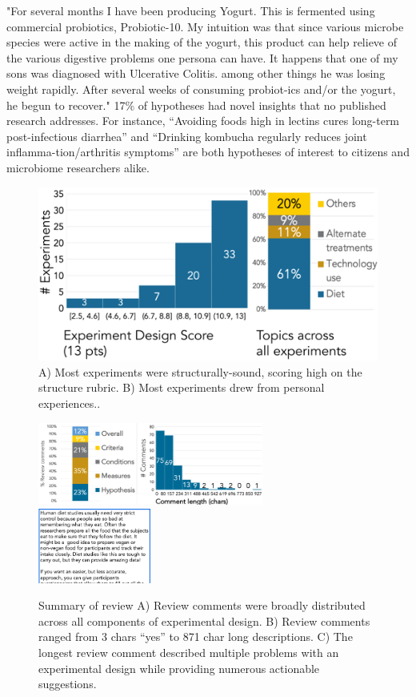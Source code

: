 "For several months I have been producing Yogurt. This is fermented using commercial probiotics, Probiotic-10. My intuition was that since various microbe species were active in the making of the yogurt, this product can help relieve of the various digestive problems one persona can have. It happens that one of my sons was diagnosed with Ulcerative Colitis. among other things he was losing weight rapidly. After several weeks of consuming probiot-ics and/or the yogurt, he begun to recover."
17\% of hypotheses had novel insights that no published research addresses. For instance, “Avoiding foods high in lectins cures long-term post-infectious diarrhea” and “Drinking kombucha regularly reduces joint inflamma-tion/arthritis symptoms” are both hypotheses of interest to citizens and microbiome researchers alike.

\begin{figure}[h] 
\centering
  \includegraphics[width=1.0\textwidth]{figures/galileo/galileo-study2-1}
  \caption[]
{A) Most experiments were structurally-sound, scoring high on the structure rubric. B) Most experiments drew from personal experiences.. }
  \label{fig:galileo-result2}
\end{figure}

\begin{figure}[h] 
  \includegraphics[width=0.66\textwidth]{figures/galileo/galileo-study2-2}
  \includegraphics[width=0.33\textwidth]{figures/galileo/galileo-study2-3}
  \caption[]
{Summary of review A) Review comments were broadly distributed across all components of experimental design. B) Review comments ranged from 3 chars “yes” to 871 char long descriptions. C) The longest review comment described multiple problems with an experimental design while providing numerous actionable suggestions. }
  \label{fig:galileo-result2-2}
\end{figure}

